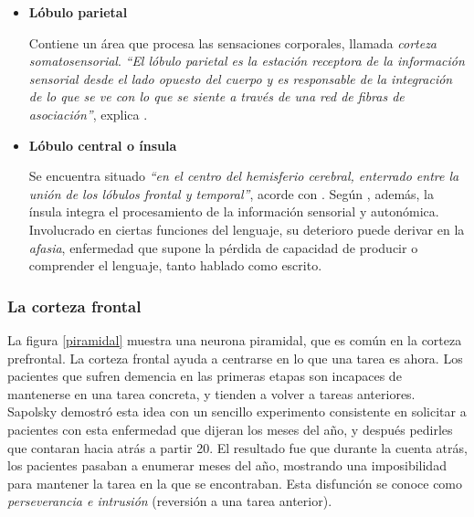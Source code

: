 \begin{itemize}
\item {\bf Lóbulo parietal}

Contiene un área que procesa las sensaciones corporales, llamada {\it corteza somatosensorial}. {\it ``El lóbulo parietal es la estación receptora de la información sensorial desde el lado opuesto del cuerpo y es responsable de la integración de lo que se ve con lo que se siente a través de una red de fibras de asociación''}, explica \cite{Restak1995}.

\item {\bf Lóbulo central o ínsula}

Se encuentra situado {\it ``en el centro del hemisferio cerebral, enterrado entre la unión de los lóbulos frontal y temporal''}, acorde con \cite{Lindberg.}. Según \cite{MerckCo.}, además, la ínsula integra el procesamiento de la información sensorial y autonómica. Involucrado en ciertas funciones del lenguaje, su deterioro puede derivar en la {\it afasia}, enfermedad que supone la pérdida de capacidad de producir o comprender el lenguaje, tanto hablado como escrito.

\end{itemize}


\subsubsection{La corteza frontal}


La figura \ref{piramidal} muestra una neurona piramidal, que es común en la corteza prefrontal. La corteza frontal ayuda a centrarse en lo que una tarea es ahora. Los pacientes que sufren demencia en las primeras etapas son incapaces de mantenerse en una tarea concreta, y tienden a volver a tareas anteriores. Sapolsky demostró esta idea con un sencillo experimento consistente en solicitar a pacientes con esta enfermedad que dijeran los meses del año, y después pedirles que contaran hacia atrás a partir 20. El resultado fue que durante la cuenta atrás, los pacientes pasaban a enumerar meses del año, mostrando una imposibilidad para mantener la tarea en la que se encontraban. Esta disfunción se conoce como {\it perseverancia e intrusión} (reversión a una tarea anterior).

